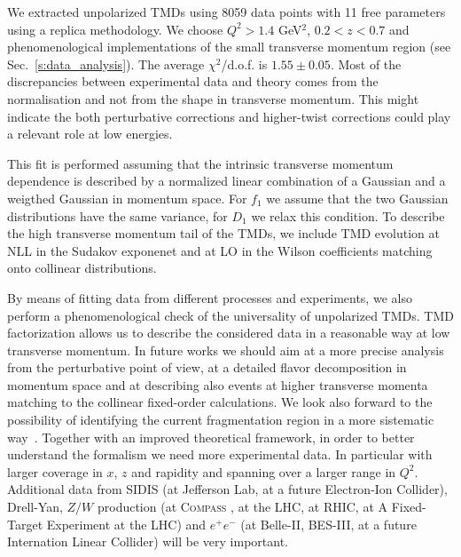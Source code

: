 \documentclass[aps,preprintnumbers,showpacs,nofootinbib,superscriptaddress,floatfix]{revtex4}
\newcommand{\compass}{\textsc{Compass }}
\begin{document}
We extracted unpolarized TMDs using 8059 data points with 11 free parameters using a replica methodology. We choose $Q^2 > 1.4$ GeV$^2$, $0.2 < z < 0.7$ and phenomenological implementations of the small transverse momentum region (see Sec.~\ref{s:data_analysis}). The average $\chi^2$/d.o.f. is $1.55 \pm 0.05$.
Most of the discrepancies between experimental data and theory comes from the normalisation and not from the shape in transverse momentum. This might indicate the both perturbative corrections and higher-twist corrections could play a relevant role at low energies.

This fit is performed assuming that the intrinsic transverse momentum dependence is described by a normalized linear combination of a Gaussian and a weigthed Gaussian in momentum space. For $f_1$ we assume that the two Gaussian distributions have the same variance, for $D_1$ we relax this condition.  To describe the high transverse momentum tail of the TMDs, we include TMD evolution at NLL in the Sudakov exponenet and at LO in the Wilson coefficients matching onto collinear distributions.

By means of fitting data from different processes and experiments, we also perform a phenomenological check of the universality of unpolarized TMDs. 
TMD factorization allows us to describe the considered data in a reasonable way at low transverse momentum. In future works we should aim at a more precise analysis from the perturbative point of view, at a detailed flavor decomposition in momentum space and at describing also events at higher transverse momenta matching to the collinear fixed-order calculations. We look also forward to the possibility of identifying the current fragmentation region in a more sistematic way~\cite{Boglione:2016bph}.
Together with an improved theoretical framework, in order to better understand the formalism we need more experimental data. In particular with larger coverage in $x$, $z$ and rapidity and spanning over a larger range in $Q^2$. 
Additional data from SIDIS (at Jefferson Lab, at a future Electron-Ion Collider), Drell-Yan, $Z/W$ production (at \compass, at the LHC, at RHIC, at A Fixed-Target Experiment at the LHC) and $e^+e^-$ (at Belle-II, BES-III, at a future Internation Linear Collider) will be very important. 
\end{document}
